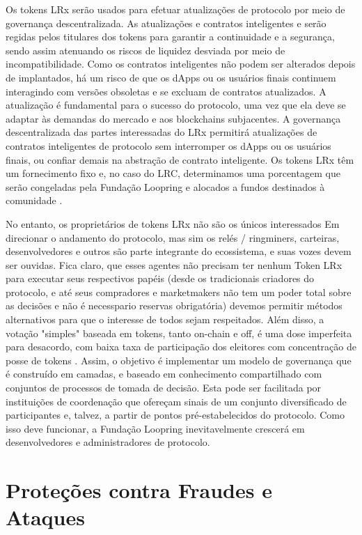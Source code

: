 \documentclass[UTF8,nofonts]{article}
\begin{document}
\begin{multicols}{2}
Os tokens LRx serão usados para efetuar atualizações de protocolo por meio de governança descentralizada. As atualizações e contratos inteligentes e serão regidas pelos titulares dos tokens para garantir a continuidade e a segurança, sendo assim atenuando os riscos de liquidez desviada por meio de incompatibilidade. Como os contratos inteligentes não podem ser alterados depois de implantados, há um risco de que os dApps ou os usuários finais continuem interagindo com versões obsoletas e se excluam de contratos atualizados. A atualização é fundamental para o sucesso do protocolo, uma vez que ela deve se adaptar às demandas do mercado e aos blockchains subjacentes. A governança descentralizada das partes interessadas do LRx permitirá atualizações de contratos inteligentes de protocolo sem interromper os dApps ou os usuários finais, ou confiar demais na abstração de contrato inteligente. Os tokens LRx têm um fornecimento fixo e, no caso do LRC, determinamos uma porcentagem que serão congeladas pela Fundação Loopring e alocados a fundos destinados à comunidade \cite{LRCtokendoc}.

No entanto, os proprietários de tokens LRx não são os únicos interessados
Em direcionar o andamento do protocolo, mas sim os  relés / ringminers,
carteiras, desenvolvedores e outros são parte integrante do ecossistema, e suas vozes devem ser ouvidas. Fica claro, que esses agentes não precisam ter nenhum Token LRx para executar seus respectivos papéis (desde os tradicionais criadores do protocolo, e até seus compradores  e marketmakers não tem um poder total sobre as decisões e não é necesspario reservas obrigatória) devemos permitir métodos alternativos para que o interesse de todos sejam respeitados. Além disso, a votação "simples" baseada em tokens, tanto on-chain e off, é uma dose imperfeita para desacordo, com baixa taxa de participação dos eleitores com concentração de posse de tokens . Assim, o objetivo é implementar um modelo de governança que é construído em camadas, e baseado em conhecimento compartilhado com conjuntos de processos de tomada de decisão. Esta pode ser facilitada por instituições de coordenação que ofereçam sinais de um conjunto diversificado de participantes e, talvez, a partir de pontos pré-estabelecidos do protocolo. Como isso deve funcionar, a Fundação Loopring inevitavelmente crescerá em desenvolvedores e administradores de protocolo.

\section{Proteções contra Fraudes e Ataques}


\end{multicols}
\end{document}
